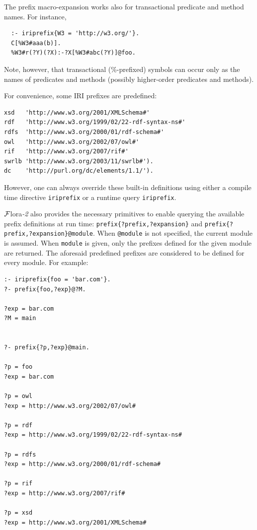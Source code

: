 \documentclass[11pt]{article}
\newcommand{\FLORA}{{\mbox{\sc ${\cal F}${lora}\rm\emph{-2}}}\xspace}
\newcommand{\FLSYSTEM}{\FLORA}
\begin{document}
The prefix macro-expansion works also for transactional predicate and
method names. For instance,
\begin{verbatim}
  :- iriprefix{W3 = 'http://w3.org/'}.
  C[%W3#aaa(b)].
  %W3#r(?Y)(?X):-?X[%W3#abc(?Y)]@foo.
\end{verbatim}
Note, however, that transactional (\%-prefixed) symbols can occur
only as the names of predicates and methods (possibly higher-order
predicates and methods).

For convenience, some IRI prefixes are predefined:
\begin{verbatim}
xsd   'http://www.w3.org/2001/XMLSchema#'
rdf   'http://www.w3.org/1999/02/22-rdf-syntax-ns#'
rdfs  'http://www.w3.org/2000/01/rdf-schema#'
owl   'http://www.w3.org/2002/07/owl#'
rif   'http://www.w3.org/2007/rif#'
swrlb 'http://www.w3.org/2003/11/swrlb#').
dc    'http://purl.org/dc/elements/1.1/').
\end{verbatim}
However, one can always override these built-in definitions using either a
compile time directive {\tt iriprefix} or a runtime query {\tt iriprefix}.

\FLSYSTEM also provides the necessary primitives to enable querying the
available prefix definitions at run time:
\texttt{prefix\{?prefix,?expansion\}} and
\texttt{prefix\{?prefix,?expansion\}@module}.
When {\tt @module}  is not
specified, the current module is assumed. When {\tt module} is given,
only the prefixes defined for the given module are returned. The
aforesaid predefined prefixes are considered to be defined for every
module. For example:
\begin{verbatim}
:- iriprefix{foo = 'bar.com'}.
?- prefix{foo,?exp}@?M.

?exp = bar.com
?M = main


?- prefix{?p,?exp}@main.

?p = foo
?exp = bar.com

?p = owl
?exp = http://www.w3.org/2002/07/owl#

?p = rdf
?exp = http://www.w3.org/1999/02/22-rdf-syntax-ns#

?p = rdfs
?exp = http://www.w3.org/2000/01/rdf-schema#

?p = rif
?exp = http://www.w3.org/2007/rif#

?p = xsd
?exp = http://www.w3.org/2001/XMLSchema#
\end{verbatim}
\end{document}
